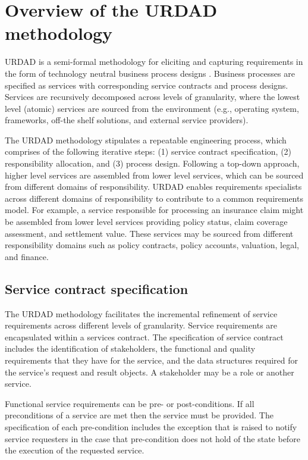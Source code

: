 \section{Overview of the URDAD methodology \label{sec:urdadMethodology}}

URDAD is a semi-formal methodology for eliciting and capturing requirements in the form of technology neutral business process designs \cite{solms_urdad_2010}. Business processes are specified as services with corresponding service contracts and process designs. Services are recursively decomposed across levels of granularity, where the lowest level (atomic) services are sourced from the environment (e.g., operating system, frameworks, off-the shelf solutions, and external service providers). 

The URDAD methodology stipulates a repeatable engineering process, which comprises of the following iterative steps: (1) service contract specification, (2) responsibility allocation, and (3) process design. Following a top-down approach, higher level services are assembled from lower level services, which can be sourced from different domains of responsibility. URDAD enables requirements specialists across different domains of responsibility to contribute to a common requirements model. For example, a service responsible for processing an insurance claim might be assembled from lower level services providing policy status, claim coverage assessment, and settlement value. These services may be sourced from different responsibility domains such as policy contracts, policy accounts, valuation, legal, and finance. 

\subsection{Service contract specification}

The URDAD methodology facilitates the incremental refinement of service requirements across different levels of granularity. Service requirements are encapsulated within a services contract. The specification of service contract includes the identification of stakeholders, the functional and quality requirements that they have for the service, and the data structures required for the service's request and result objects. A stakeholder may be a role or another service.

Functional service requirements can be pre- or post-conditions. If all preconditions of a service are met then the service must be provided. The specification of each pre-condition includes the exception that is raised to notify service requesters in the case that pre-condition does not hold of the state before the execution of the requested service. 

